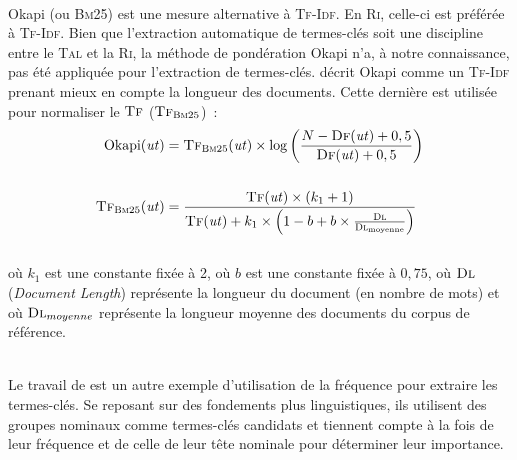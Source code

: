         ~\\Okapi (ou \textsc{Bm}25) \cite{robertson1999okapi} est une mesure
        alternative à \textsc{Tf-Idf}. En \textsc{Ri},
        celle-ci est préférée à \textsc{Tf-Idf}. Bien que l'extraction
        automatique de termes-clés soit une discipline entre le
        \textsc{Tal} et la \textsc{Ri}, la méthode de pondération Okapi n'a, à
        notre connaissance, pas été appliquée pour l'extraction de termes-clés.
         décrit Okapi comme un \textsc{Tf-Idf}
        prenant mieux en compte la longueur des documents. Cette dernière est
        utilisée pour normaliser le $\textsc{Tf}$
        ($\textsc{Tf}_{\textsc{Bm}25}$)~:
        \begin{align}
          \text{Okapi}(\text{\textit{ut}}) &= \textsc{Tf}_{\textsc{Bm}25}(\text{\textit{ut}}) \times \log\left(\frac{N - \textsc{Df}(\text{\textit{ut}}) + 0,5}{\textsc{Df}(\text{\textit{ut}}) + 0,5}\right) \label{math:okapi}\\
          \notag\\
          \textsc{Tf}_{\textsc{Bm}25}(\text{\textit{ut}}) &= \frac{\textsc{Tf}(\text{\textit{ut}}) \times (k_1 + 1)}{\textsc{Tf}(\text{\textit{ut}}) + k_1 \times \left(1 - b + b \times \frac{\textsc{Dl}}{\textsc{Dl}_{\text{moyenne}}}\right)} \label{math:tf_bm25}
        \end{align}\\
        où $k_1$ est une constante fixée à 2, où $b$ est une constante fixée à
        $0,75$, où $\textsc{Dl}$ (\textit{Document Length}) représente la
        longueur du document (en nombre de mots) et où $\textsc{Dl}_{moyenne}$
        représente la longueur moyenne des documents du corpus de référence.

        ~\\Le travail de  est un autre exemple
        d'utilisation de la fréquence pour extraire les termes-clés. Se reposant
        sur des fondements plus linguistiques, ils utilisent des groupes
        nominaux comme termes-clés candidats et tiennent compte à la fois de
        leur fréquence et de celle de leur tête nominale pour déterminer leur
        importance.
        
